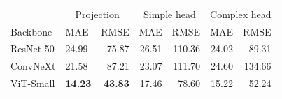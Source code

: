 





\setlength\tabcolsep{4.5pt}
\begin{tabular}{llrrrrr}
\toprule
 & \multicolumn{2}{c}{Projection} & \multicolumn{2}{c}{Simple head}  & \multicolumn{2}{c}{Complex head} \\
 Backbone & MAE & RMSE & MAE & RMSE & MAE & RMSE \\
 \midrule
ResNet-50 & 24.99 & 75.87 & 26.51 & 110.36 & 24.02 & 89.31\\

ConvNeXt &  21.58 & 87.21 & 23.07 & 111.70 & 24.60 & 134.66 \\
ViT-Small &   \textbf{14.23}  & \textbf{43.83}  & 17.46 & 78.60 & 15.22 & 52.24\\

\bottomrule
\end{tabular}